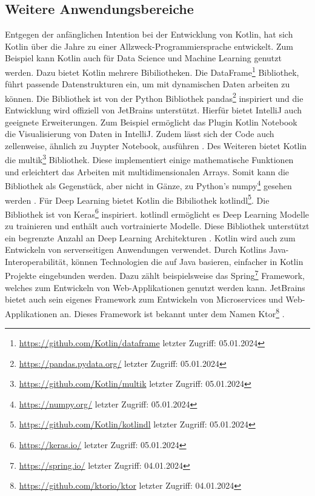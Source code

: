 \documentclass{article}
\begin{document}
\subsection{Weitere Anwendungsbereiche}
Entgegen der anfänglichen Intention bei der Entwicklung von Kotlin, hat sich Kotlin über die Jahre zu einer Allzweck-Programmiersprache entwickelt. Zum Beispiel kann Kotlin auch für Data Science und Machine Learning genutzt werden. Dazu bietet Kotlin mehrere Bibiliotheken. Die DataFrame\footnote{\url{https://github.com/Kotlin/dataframe} letzter Zugriff: 05.01.2024} Bibliothek, führt passende Datenstrukturen ein, um mit dynamischen Daten arbeiten zu können. Die Bibliothek ist von der Python Bibliothek pandas\footnote{\url{https://pandas.pydata.org/} letzter Zugriff: 05.01.2024} inspiriert und die Entwicklung wird offiziell von JetBrains unterstützt. Hierfür bietet IntelliJ auch geeignete Erweiterungen. Zum Beispiel ermöglicht das Plugin Kotlin Notebook die Visualisierung von Daten in IntelliJ. Zudem lässt sich der Code auch zellenweise, ähnlich zu Juypter Notebook, ausführen \cite{KotlinLangDocData}. \newline
Des Weiteren bietet Kotlin die multik\footnote{\url{https://github.com/Kotlin/multik} letzter Zugriff: 05.01.2024} Bibliothek. Diese implementiert einige mathematische Funktionen und erleichtert das Arbeiten mit multidimensionalen Arrays. Somit kann die Bibliothek als Gegenstück, aber nicht in Gänze, zu Python's numpy\footnote{\url{https://numpy.org/} letzter Zugriff: 05.01.2024} gesehen werden \cite{KotlinLangDocData}. \newline
Für Deep Learning bietet Kotlin die Bibiliothek kotlindl\footnote{\url{https://github.com/Kotlin/kotlindl} letzter Zugriff: 05.01.2024}. Die Bibliothek ist von Keras\footnote{\url{https://keras.io/} letzter Zugriff: 05.01.2024} inspiriert. kotlindl ermöglicht es Deep Learning Modelle zu trainieren und enthält auch vortrainierte Modelle. Diese Bibliothek unterstützt ein begrenzte Anzahl an Deep Learning Architekturen \cite{KotlinLangDocData}. \newline
Kotlin wird auch zum Entwickeln von serverseitigen Anwendungen verwendet. Durch Kotlins Java-Interoperabilität, können Technologien die auf Java basieren, einfacher in Kotlin Projekte eingebunden werden. Dazu zählt beispielsweise das Spring\footnote{\url{https://spring.io/} letzter Zugriff: 04.01.2024} Framework, welches zum Entwickeln von Web-Applikationen genutzt werden kann. JetBrains bietet auch sein eigenes Framework zum Entwickeln von Microservices und Web-Applikationen an. Dieses Framework ist bekannt unter dem Namen Ktor\footnote{\url{https://github.com/ktorio/ktor} letzter Zugriff: 04.01.2024} \cite{KotlinLangDocServer}.
\end{document}
